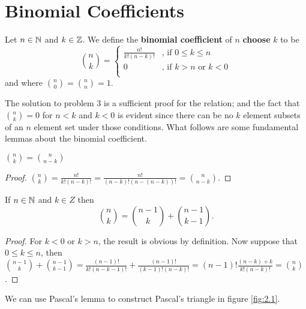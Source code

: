 
\chapter{Binomial Coefficients} %

\label{Chapter 2} %


\begin{definition}
    Let $n \in \mathbb{N}$ and  $k \in \mathbb{Z}$. We define the \textbf {binomial coefficient} of $n$ \textbf
    {choose} $k$ to be 
        \begin{equation}
        \binom{n}{k}=\begin{cases}
            \frac{n!}{k!(n-k)!} & \text{, if } 0 \leq k \leq n \\
            0                   & \text{, if } k>n \text{ or } k<0 \\
                    \end{cases}
        \end{equation} 
    and where $\binom{n}{0}=\binom{n}{n}=1$.
\end{definition}

The solution to problem $3$ is a sufficient proof for the relation; and the fact that
$\binom{n}{k}=0$ for $n<k$ and  $k<0$ is evident since there can be no  $k$ element subsets of an
$n$ element set under those conditions. What follows are some fundamental lemmas about the binomial
coefficient.

\begin{lemma}[Symmetry]\label{2.0.1}
    $\binom{n}{k}=\binom{n}{n-k}$
\end{lemma}
\begin{proof}
    $\binom{n}{k}=\frac{n!}{k!(n-k)!}=\frac{n!}{(n-k)!(n-(n-k))!}=\binom{n}{n-k}$.
\end{proof}

\begin{lemma}\label{2.0.2}
    If $n \in \mathbb{N}$ and  $k \in Z$ then 
        \begin{equation}
            \binom{n}{k}=\binom{n-1}{k}+\binom{n-1}{k-1}.
        \end{equation} 
\end{lemma}
\begin{proof}
    For $k<0$ or  $k>n$, the result is obvious by definition. Now suppose that $0 \leq k \leq n$,
    then
    $\binom{n-1}{k}+\binom{n-1}{k-1}=\frac{(n-1)!}{k!(n-k-1)!}+\frac{(n-1)!}{(k-1)!(n-k)!}=(n-1)!\frac{(n-k)+k}{k!(n-k)!}=\binom{n}{k}$.
\end{proof}
\begin{remark} 
    We can use Pascal's lemma to construct Pascal's triangle in figure \ref{fig:2.1}.
\end{remark}

